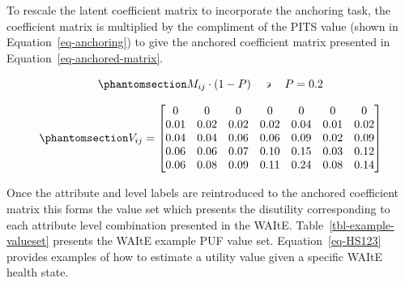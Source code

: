 \documentclass[
  letterpaper,
  DIV=11,
  numbers=noendperiod]{scrartcl}
\begin{document}
To rescale the latent coefficient matrix to incorporate the anchoring
task, the coefficient matrix is multiplied by the compliment of the PITS
value (shown in Equation~\ref{eq-anchoring}) to give the anchored
coefficient matrix presented in Equation~\ref{eq-anchored-matrix}.

\begin{equation}\phantomsection\label{eq-anchoring}{
    M_{ij} \cdot (1-P) \quad \backepsilon \quad P = 0.2 
}\end{equation}

\begin{equation}\phantomsection\label{eq-anchored-matrix}{
V_{ij} =  
\begin{bmatrix}
0 & 0 & 0 & 0 & 0 & 0 & 0 \\
0.01 & 0.02 & 0.02 & 0.02 & 0.04 & 0.01 & 0.02 \\
0.04 & 0.04 & 0.06 & 0.06 & 0.09 & 0.02 & 0.09 \\
0.06 & 0.06 & 0.07 & 0.10 & 0.15 & 0.03 & 0.12 \\
0.06 & 0.08 & 0.09 & 0.11 & 0.24 & 0.08 & 0.14 \\
\end{bmatrix}
}\end{equation}

Once the attribute and level labels are reintroduced to the anchored
coefficient matrix this forms the value set which presents the
disutility corresponding to each attribute level combination presented
in the WAItE. Table~\ref{tbl-example-valueset} presents the WAItE
example PUF value set. Equation~\ref{eq-HS123} provides examples of how
to estimate a utility value given a specific WAItE health state.

\begin{table}

\caption{\label{tbl-example-valueset}WAItE example PUF value set}


\end{table}%
\end{document}
